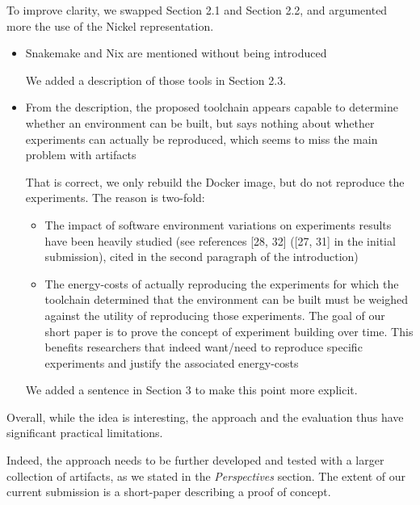 \documentclass[%
	11pt,
	final,
]{article}
\begin{document}
\begin{itemize}
\begin{itemize}
\begin{review-answer}
  To improve clarity, we swapped Section 2.1 and Section 2.2, and argumented more the use of the Nickel representation.
\end{review-answer}
   \begin{itemize}
    \item Snakemake and Nix are mentioned without being introduced
      \begin{review-answer}
        We added a description of those tools in Section 2.3.
      \end{review-answer}
    \item From the description, the proposed toolchain appears capable to determine whether an environment can be built, but says nothing about whether experiments can actually be reproduced, which seems to miss the main problem with artifacts
      \begin{review-answer}
        That is correct, we only rebuild the Docker image, but do not reproduce the experiments.
        The reason is two-fold:
        \begin{itemize}
        \item The impact of software environment variations on experiments results have been heavily studied (see references [28, 32] ([27, 31] in the initial submission), cited in the second paragraph of the introduction)
        \item The energy-costs of actually reproducing the experiments for which the toolchain determined that the environment can be built must be weighed against the utility of reproducing those experiments. The goal of our short paper is to prove the concept of experiment building over time. This benefits researchers that indeed want/need to reproduce specific experiments and justify the associated energy-costs
        \end{itemize}


        We added a sentence in Section 3 to make this point more explicit.
      \end{review-answer}
    \end{itemize}
    \end{itemize}
\end{itemize}

Overall, while the idea is interesting, the approach and the evaluation thus have significant practical limitations.

\begin{review-answer}
  Indeed, the approach needs to be further developed and tested with a larger collection of artifacts, as we stated in the \emph{Perspectives} section.
  The extent of our current submission is a short-paper describing a proof of concept.
\end{review-answer}
\end{document}
